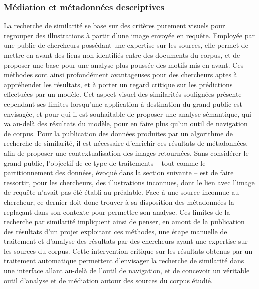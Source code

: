     \subsubsection{Médiation et métadonnées descriptives}
    La recherche de similarité se base sur des critères purement visuels pour regrouper des illustrations à partir d'une image envoyée en requête. Employée par une public de chercheurs possédant une expertise sur les sources, elle permet de mettre en avant des liens non-identifiés entre des documents du corpus, et de proposer une base pour une analyse plus poussée des motifs mis en avant. Ces méthodes sont ainsi profondément avantageuses pour des chercheurs aptes à appréhender les résultats, et à porter un regard critique sur les prédictions effectuées par un modèle. Cet aspect visuel des similarités soulignées présente cependant ses limites lorsqu'une application à destination du grand public est envisagée, et pour qui il est souhaitable de proposer une analyse sémantique, qui va au-delà des résultats du modèle, pour en faire plus qu'un outil de navigation de corpus. Pour la publication des données produites par un algorithme de recherche de similarité, il est nécessaire d'enrichir ces résultats de métadonnées, afin de proposer une contextualisation des images retournées. Sans considérer le grand public, l'objectif de ce type de traitements -- tout comme le partitionnement des données, évoqué dans la section suivante -- est de faire ressortir, pour les chercheurs, des illustrations inconnues, dont le lien avec l'image de requête n'avait pas été établi au préalable. Face à une source inconnue au chercheur, ce dernier doit donc trouver à sa disposition des métadonnées la replaçant dans son contexte pour permettre son analyse. Ces limites de la recherche par similarité impliquent ainsi de penser, en amont de la publication des résultats d'un projet exploitant ces méthodes, une étape manuelle de traitement et d'analyse des résultats par des chercheurs ayant une expertise sur les sources du corpus. Cette intervention critique sur les résultats obtenus par un traitement automatique permettent d'envisager la recherche de similarité dans une interface allant au-delà de l'outil de navigation, et de concevoir un véritable outil d'analyse et de médiation autour des sources du corpus étudié.

